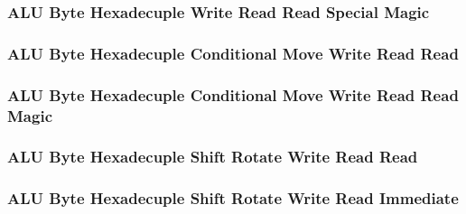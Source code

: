 

\subsubsection[{\small ALU Byte Hexadecuple Write Read Read Special Magic}]{ALU Byte Hexadecuple Write Read Read Special Magic} \label{sec:format-ALU-BXWRRS.M}



\subsubsection[{\small ALU Byte Hexadecuple Conditional Move Write Read Read}]{ALU Byte Hexadecuple Conditional Move Write Read Read} \label{sec:format-ALU-BXCMWRR}



\subsubsection[{\small ALU Byte Hexadecuple Conditional Move Write Read Read Magic}]{ALU Byte Hexadecuple Conditional Move Write Read Read Magic} \label{sec:format-ALU-BXCMWRR.M}



\subsubsection[{\small ALU Byte Hexadecuple Shift Rotate Write Read Read}]{ALU Byte Hexadecuple Shift Rotate Write Read Read} \label{sec:format-ALU-BXSWRR}



\subsubsection[{\small ALU Byte Hexadecuple Shift Rotate Write Read Immediate}]{ALU Byte Hexadecuple Shift Rotate Write Read Immediate} \label{sec:format-ALU-BXSWRI}

